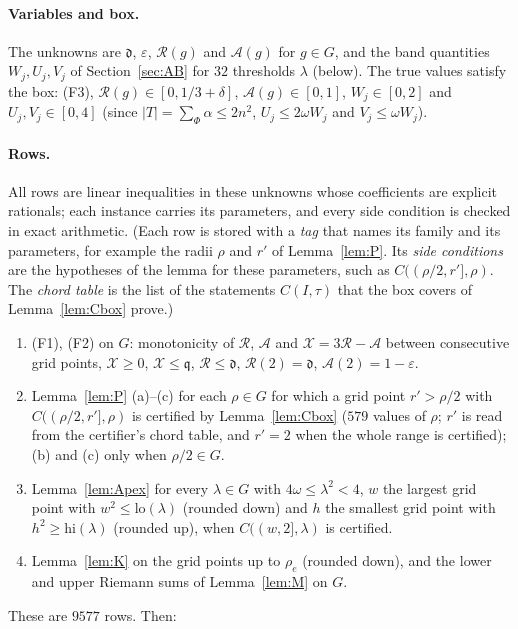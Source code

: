 \documentclass[11pt]{article}
\newcommand{\eps}{\varepsilon}
\newcommand{\cA}{\mathcal{A}}
\newcommand{\cR}{\mathcal{R}}
\newcommand{\cX}{\mathcal{X}}
\newcommand{\dd}{\mathfrak{d}}
\newcommand{\qq}{\mathfrak{q}}
\theoremstyle{remark}
\begin{document}
\paragraph{Variables and box.} The unknowns are $\dd$, $\eps$, $\cR(g)$ and
$\cA(g)$ for $g \in G$, and the band quantities $W_j, U_j, V_j$ of
Section~\ref{sec:AB} for $32$ thresholds $\lambda$ (below). The true values
satisfy the box: (F3), $\cR(g) \in [0, 1/3 + \delta]$, $\cA(g) \in [0,1]$,
$W_j \in [0,2]$ and $U_j, V_j \in [0,4]$ (since $|T| = \sum_\Phi\alpha \le
2n^2$, $U_j \le 2\omega W_j$ and $V_j \le \omega W_j$).

\paragraph{Rows.} All rows are linear inequalities in these unknowns whose
coefficients are explicit rationals; each instance carries its parameters, and every side condition is checked in exact arithmetic. (Each row is stored with a \emph{tag} that names its family and its parameters, for example the radii $\rho$ and $r'$ of Lemma~\ref{lem:P}. Its \emph{side conditions} are the hypotheses of the lemma for these parameters, such as $C((\rho/2, r'], \rho)$. The \emph{chord table} is the list of the statements $C(I, \tau)$ that the box covers of Lemma~\ref{lem:Cbox} prove.)
\begin{enumerate}
\item (F1), (F2) on $G$: monotonicity of $\cR$, $\cA$ and $\cX = 3\cR -
  \cA$ between consecutive grid points, $\cX \ge 0$, $\cX \le \qq$,
  $\cR \le \dd$, $\cR(2) = \dd$, $\cA(2) = 1 - \eps$.
\item Lemma~\ref{lem:P} (a)--(c) for each $\rho \in G$ for which a grid
  point $r' > \rho/2$ with $C((\rho/2, r'], \rho)$ is certified by
  Lemma~\ref{lem:Cbox} ($579$ values of $\rho$; $r'$ is read from the
  certifier's chord table, and $r' = 2$ when the whole range is
  certified); (b) and (c) only when $\rho/2 \in G$.
\item Lemma~\ref{lem:Apex} for every $\lambda \in G$ with
  $4\omega \le \lambda^2 < 4$, $w$ the largest grid point with $w^2 \le
  \mathrm{lo}(\lambda)$ (rounded down) and $h$ the smallest grid point with
  $h^2 \ge \mathrm{hi}(\lambda)$ (rounded up), when $C((w,2],\lambda)$ is
  certified.
\item Lemma~\ref{lem:K} on the grid points up to $\rho_e$ (rounded down),
  and the lower and upper Riemann sums of Lemma~\ref{lem:M} on $G$.
\end{enumerate}
These are $9577$ rows. Then:
\end{document}
